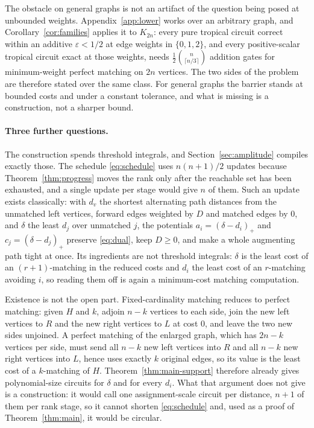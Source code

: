 \documentclass[11pt]{article}
\begin{document}
The obstacle on general graphs is not an artifact of the question being posed at
unbounded weights.  Appendix~\ref{app:lower} works over an arbitrary graph, and
Corollary~\ref{cor:families} applies it to $K_{2n}$: every pure tropical circuit
correct within an additive $\varepsilon<1/2$ at edge weights in $\{0,1,2\}$, and
every positive-scalar tropical circuit exact at those weights, needs
$\tfrac12\binom{n}{\lceil n/3\rceil}$ addition gates for minimum-weight perfect
matching on $2n$ vertices.  The two sides of the problem are therefore stated
over the same class.  For general graphs the barrier stands at bounded costs and
under a constant tolerance, and what is missing is a construction, not a sharper
bound.

\paragraph{Three further questions.}
The construction spends threshold integrals, and Section~\ref{sec:amplitude}
compiles exactly those.  The schedule \eqref{eq:schedule} uses $n(n+1)/2$
updates because Theorem~\ref{thm:progress} moves the rank only after the
reachable set has been exhausted, and a single update per stage would give
$n$ of them.  Such an update exists classically: with $d_v$ the shortest
alternating path distances from the unmatched left vertices, forward edges
weighted by $D$ and matched edges by $0$, and $\delta$ the least $d_j$ over
unmatched $j$, the potentials $a_i=(\delta-d_i)_+$ and $c_j=(\delta-d_j)_+$
preserve \eqref{eq:dual}, keep $D\ge0$, and make a whole augmenting path tight
at once.  Its ingredients are not threshold integrals: $\delta$ is the least
cost of an $(r+1)$-matching in the reduced costs and $d_i$ the least cost of an
$r$-matching avoiding $i$, so reading them off is again a minimum-cost matching
computation.

Existence is not the open part.  Fixed-cardinality matching reduces to perfect
matching: given $H$ and $k$, adjoin $n-k$ vertices to each side, join the new
left vertices to $R$ and the new right vertices to $L$ at cost $0$, and leave the
two new sides unjoined.  A perfect matching of the enlarged graph, which has
$2n-k$ vertices per side, must send all $n-k$ new left vertices into $R$ and all
$n-k$ new right vertices into $L$, hence uses exactly $k$ original edges, so its
value is the least cost of a $k$-matching of $H$.  Theorem~\ref{thm:main-support}
therefore already gives polynomial-size circuits for $\delta$ and for every
$d_i$.  What that argument does not give is a construction: it would call one
assignment-scale circuit per distance, $n+1$ of them per rank stage, so it
cannot shorten \eqref{eq:schedule} and, used as a proof of
Theorem~\ref{thm:main}, it would be circular.
\end{document}
